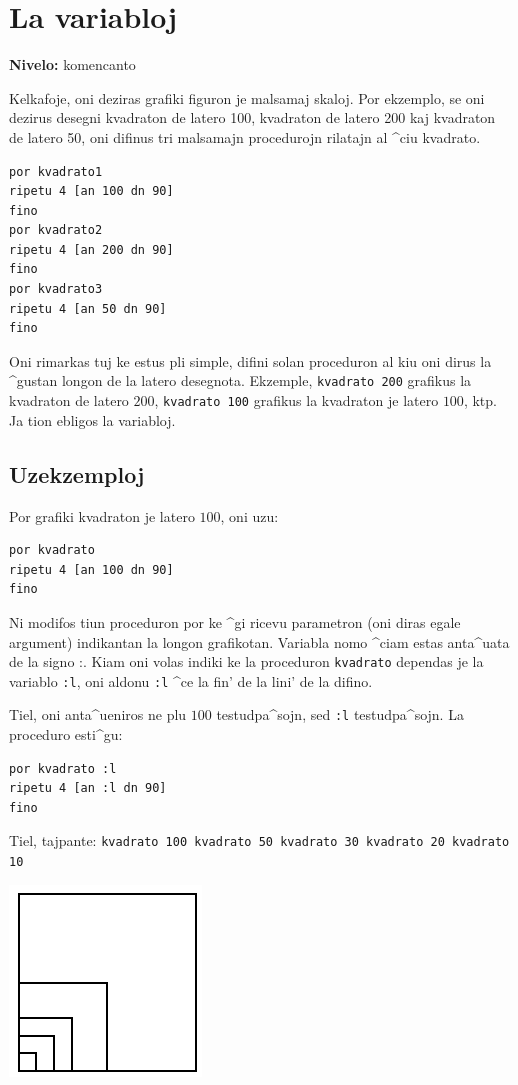 \chapter{La variabloj}
\label{variabloj}

{ }\hfill\textbf{Nivelo:} komencanto

\noindent \noindent Kelkafoje, oni deziras grafiki figuron je malsamaj
skaloj.  Por ekzemplo, se oni dezirus desegni kvadraton de latero 100,
kvadraton de latero 200 kaj kvadraton de latero 50, oni difinus tri
malsamajn procedurojn rilatajn al ^ciu kvadrato.
\begin{verbatim}
por kvadrato1
ripetu 4 [an 100 dn 90]
fino
por kvadrato2
ripetu 4 [an 200 dn 90]
fino
por kvadrato3
ripetu 4 [an 50 dn 90]
fino
\end{verbatim}

Oni rimarkas tuj ke estus pli simple, difini solan proceduron al kiu
oni dirus la ^gustan longon de la latero desegnota.  Ekzemple,
\texttt{kvadrato 200} grafikus la kvadraton de latero $200$,
\texttt{kvadrato 100} grafikus la kvadraton je latero $100$, ktp.  Ja
tion ebligos la variabloj.

\section{Uzekzemploj}
\noindent Por grafiki kvadraton je latero $100$, oni uzu:
\begin{verbatim}
por kvadrato
ripetu 4 [an 100 dn 90]
fino
\end{verbatim}
Ni modifos tiun proceduron por ke ^gi ricevu parametron (oni diras
egale \og argument\fg) indikantan la longon grafikotan.  Variabla nomo
^ciam estas anta^uata de la signo \og :\fg.  Kiam oni volas indiki ke
la proceduron \texttt{kvadrato} dependas je la variablo \texttt{:l}, oni
aldonu \texttt{:l} ^ce la fin' de la lini' de la difino.

Tiel, oni anta^ueniros ne plu $100$ testudpa^sojn, sed \texttt{:l}
testudpa^sojn.  La proceduro esti^gu:

\begin{verbatim}
por kvadrato :l
ripetu 4 [an :l dn 90]
fino
\end{verbatim}
Tiel, tajpante: \texttt{kvadrato 100 kvadrato 50 kvadrato 30 kvadrato 20 kvadrato 10}\\
 \begin{center}
\includegraphics[scale=0.5]{bildoj/variables-carres.png}
\end{center}
\vspace{1cm}

